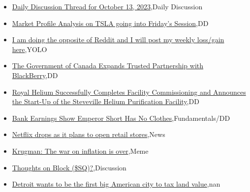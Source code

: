 \documentclass{article}%
\begin{document}
%
\begin{itemize}%
\item%
\href{https://reddit.com/r/wallstreetbets/comments/176v7zu/daily\_discussion\_thread\_for\_october\_13\_2023/}{Daily Discussion Thread for October 13, 2023},Daily Discussion%
\item%
\href{https://reddit.com/r/wallstreetbets/comments/176qmfx/market\_profile\_analysis\_on\_tsla\_going\_into/}{Market Profile Analysis on TSLA going into Friday's Session},DD%
\item%
\href{https://reddit.com/r/wallstreetbets/comments/176ox9t/i\_am\_doing\_the\_opposite\_of\_reddit\_and\_i\_will\_post/}{I am doing the opposite of Reddit and I will post my weekly loss/gain here},YOLO%
\item%
\href{https://reddit.com/r/Baystreetbets/comments/176aqqw/the\_government\_of\_canada\_expands\_trusted/}{The Government of Canada Expands Trusted Partnership with BlackBerry},DD%
\item%
\href{https://reddit.com/r/Baystreetbets/comments/1766rwc/royal\_helium\_successfully\_completes\_facility/}{Royal Helium Successfully Completes Facility Commissioning and Announces the Start-Up of the Steveville Helium Purification Facility},DD%
\item%
\href{https://reddit.com/r/StockMarket/comments/176xa22/bank\_earnings\_show\_emperor\_short\_has\_no\_clothes/}{Bank Earnings Show Emperor Short Has No Clothes},Fundamentals/DD%
\item%
\href{https://reddit.com/r/StockMarket/comments/176rld2/netflix\_drops\_as\_it\_plans\_to\_open\_retail\_stores/}{Netflix drops as it plans to open retail stores},News%
\item%
\href{https://reddit.com/r/StockMarket/comments/176o1f1/krugman\_the\_war\_on\_inflation\_is\_over/}{Krugman: The war on inflation is over},Meme%
\item%
\href{https://reddit.com/r/StockMarket/comments/175t3ef/thoughts\_on\_block\_sq/}{Thoughts on Block (\$SQ)?},Discussion%
\item%
\href{https://reddit.com/r/Economics/comments/176gk9g/detroit\_wants\_to\_be\_the\_first\_big\_american\_city/}{Detroit wants to be the first big American city to tax land value},nan%
\end{itemize}%
\end{document}
